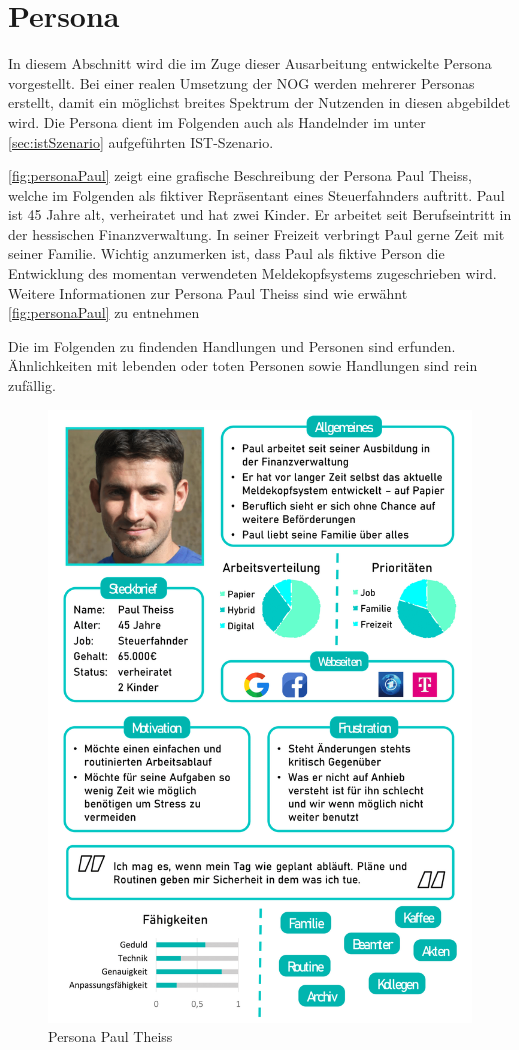 \section{Persona} 

In diesem Abschnitt wird die im Zuge dieser Ausarbeitung entwickelte Persona vorgestellt.
Bei einer realen Umsetzung der NOG werden mehrerer Personas erstellt, damit ein möglichst breites Spektrum der Nutzenden in diesen abgebildet wird.
Die Persona dient im Folgenden auch als Handelnder im unter \autoref{sec:istSzenario} aufgeführten IST-Szenario.

\autoref{fig:personaPaul} zeigt eine grafische Beschreibung der Persona Paul Theiss, welche im Folgenden als fiktiver Repräsentant eines Steuerfahnders auftritt.
Paul ist 45 Jahre alt, verheiratet und hat zwei Kinder.
Er arbeitet seit Berufseintritt in der hessischen Finanzverwaltung.
In seiner Freizeit verbringt Paul gerne Zeit mit seiner Familie.
Wichtig anzumerken ist, dass Paul als fiktive Person die Entwicklung des momentan verwendeten Meldekopfsystems zugeschrieben wird. 
Weitere Informationen zur Persona Paul Theiss sind wie erwähnt \autoref{fig:personaPaul} zu entnehmen

Die im Folgenden zu findenden Handlungen und Personen sind erfunden. Ähnlichkeiten mit lebenden oder toten Personen sowie Handlungen sind rein zufällig. 

\begin{figure}
    \centering
    \includegraphics[width=\textwidth]{images/persona_1.png}
    \caption{Persona Paul Theiss}
    \label{fig:personaPaul}
\end{figure}